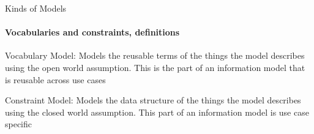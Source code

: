 \begin{frame}{Kinds of Models}
    \framesubtitle{Vocabularies and constraints, definitions}


   \begin{definition}
   \colorbox{newlightblue}{Vocabulary Model}: Models the reusable terms of the things the model describes using the open world assumption. This is the part of an information model that is reusable across use cases
   \end{definition}

   \begin{definition}
   \colorbox{neworange}{Constraint Model}: Models the data structure of the things the model describes using the closed world assumption. This part of an information model is use case specific
   \end{definition}
\end{frame}
